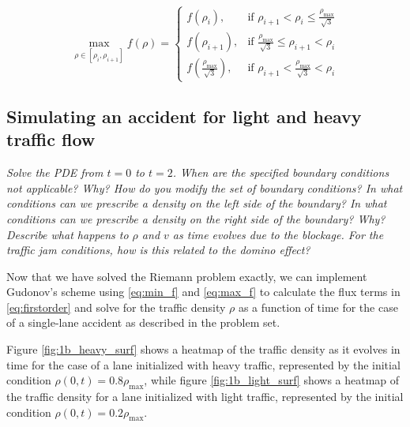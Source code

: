 \documentclass[11pt]{article}
\begin{document}
\begin{equation} \label{eq:max_f}
\max_{\rho \in \left[\rho_i, \rho_{i+1}\right]} f(\rho) =
\begin{cases}
  f(\rho_i),&
    \text{if } \rho_{i+1} < \rho_i \le \frac{\rho_\mathrm{max}}{\sqrt{3}} \\
  f(\rho_{i+1}),&
    \text{if } \frac{\rho_\mathrm{max}}{\sqrt{3}} \le \rho_{i+1} < \rho_i \\
  f\left( \frac{\rho_\mathrm{max}}{\sqrt{3}} \right) ,&
  \text{if } \rho_{i+1} < \frac{\rho_\mathrm{max}}{\sqrt{3}} < \rho_i
\end{cases}
\end{equation}

\subsection{Simulating an accident for light and heavy traffic flow}
\begin{tcolorbox}
  \textit{Solve the PDE from $t = 0$ to $t = 2$. When are the specified boundary conditions not applicable? Why? How do you modify the set of boundary conditions? In what conditions can we prescribe a density on the left side of the boundary? In what conditions can we prescribe a density on the right side of the boundary? Why? Describe what happens to $\rho$ and $v$ as time evolves due to the blockage. For the traffic jam conditions, how is this related to the domino effect?}
\end{tcolorbox}

Now that we have solved the Riemann problem exactly, we can implement Gudonov's scheme using \eqref{eq:min_f} and \eqref{eq:max_f} to calculate the flux terms in \eqref{eq:firstorder} and solve for the traffic density $\rho$ as a function of time for the case of a single-lane accident as described in the problem set.

Figure \ref{fig:1b_heavy_surf} shows a heatmap of the traffic density as it evolves in time for the case of a lane initialized with heavy traffic, represented by the initial condition $\rho(0,t) = 0.8\rho_\mathrm{max}$, while figure \ref{fig:1b_light_surf} shows a heatmap of the traffic density for a lane initialized with light traffic, represented by the initial condition $\rho(0,t) = 0.2\rho_\mathrm{max}$.
\end{document}
